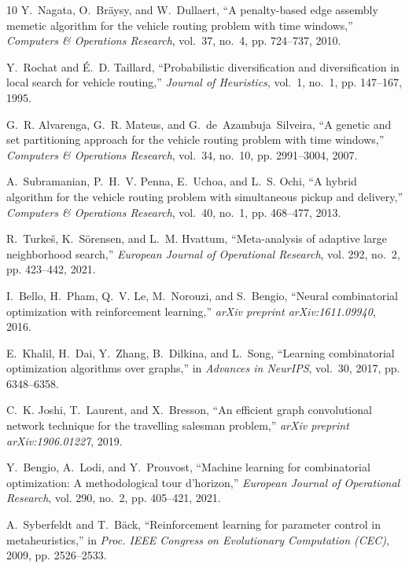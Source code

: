 \documentclass{ieeeaccess}
\begin{document}
{\begin{thebibliography}{10}
Y.~Nagata, O.~Br{\"a}ysy, and W.~Dullaert, ``A penalty-based edge assembly memetic algorithm for the vehicle routing problem with time windows,'' \emph{Computers \& Operations Research}, vol.~37, no.~4, pp. 724--737, 2010.

Y.~Rochat and {\'E}.~D. Taillard, ``Probabilistic diversification and diversification in local search for vehicle routing,'' \emph{Journal of Heuristics}, vol.~1, no.~1, pp. 147--167, 1995.

G.~R. Alvarenga, G.~R. Mateus, and G.~de~Azambuja~Silveira, ``A genetic and set partitioning approach for the vehicle routing problem with time windows,'' \emph{Computers \& Operations Research}, vol.~34, no.~10, pp. 2991--3004, 2007.

A.~Subramanian, P.~H.~V. Penna, E.~Uchoa, and L.~S. Ochi, ``A hybrid algorithm for the vehicle routing problem with simultaneous pickup and delivery,'' \emph{Computers \& Operations Research}, vol.~40, no.~1, pp. 468--477, 2013.

R.~Turke{\v{s}}, K.~S{\"o}rensen, and L.~M. Hvattum, ``Meta-analysis of adaptive large neighborhood search,'' \emph{European Journal of Operational Research}, vol. 292, no.~2, pp. 423--442, 2021.

I.~Bello, H.~Pham, Q.~V. Le, M.~Norouzi, and S.~Bengio, ``Neural combinatorial optimization with reinforcement learning,'' \emph{arXiv preprint arXiv:1611.09940}, 2016.

E.~Khalil, H.~Dai, Y.~Zhang, B.~Dilkina, and L.~Song, ``Learning combinatorial optimization algorithms over graphs,'' in \emph{Advances in NeurIPS}, vol.~30, 2017, pp. 6348--6358.

C.~K. Joshi, T.~Laurent, and X.~Bresson, ``An efficient graph convolutional network technique for the travelling salesman problem,'' \emph{arXiv preprint arXiv:1906.01227}, 2019.

Y.~Bengio, A.~Lodi, and Y.~Prouvost, ``Machine learning for combinatorial optimization: A methodological tour d'horizon,'' \emph{European Journal of Operational Research}, vol. 290, no.~2, pp. 405--421, 2021.

A.~Syberfeldt and T.~B{\"a}ck, ``Reinforcement learning for parameter control in metaheuristics,'' in \emph{Proc. IEEE Congress on Evolutionary Computation (CEC)}, 2009, pp. 2526--2533.


\end{thebibliography}}
\end{document}
